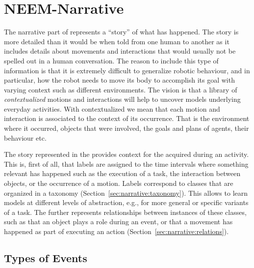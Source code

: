 
\chapter{NEEM-Narrative}
\label{ch:narrative}

The narrative part of \neems represents a ``story'' of what has happened.
The story is more detailed than it would be when told from one human to another
as it includes details about movements and interactions that would usually not be spelled out in a human conversation.
The reason to include this type of information is that it is extremely difficult to generalize robotic behaviour, and in particular, how the robot needs to move its body to accomplish its goal with varying context such as different environments.
The vision is that a library of \emph{contextualized} motions and interactions will help to uncover models underlying everyday activities.
With contextualized we mean that each motion and interaction is associated to the context of its occurrence.
That is the environment where it occurred, objects that were involved, the goals and plans of agents, their behaviour etc.

The story represented in the \neemnar provides context for the \neemexp acquired during an activity.
This is, first of all, that labels are assigned to the time intervals where something relevant has happened such as the execution of a task, the interaction between objects, or the occurrence of a motion.
Labels correspond to classes that are organized in a taxonomy (Section~\ref{sec:narrative:taxonomy}).
This allows to learn models at different levels of abstraction, 
e.g., for more general or specific variants of a task.
The \neemnar further represents relationships between instances of these classes, such as that an object plays a role during an event, or that a movement has happened as part of executing an action
(Section~\ref{sec:narrative:relations}).

\section{Types of Events}
\label{sec:narrative:events}

